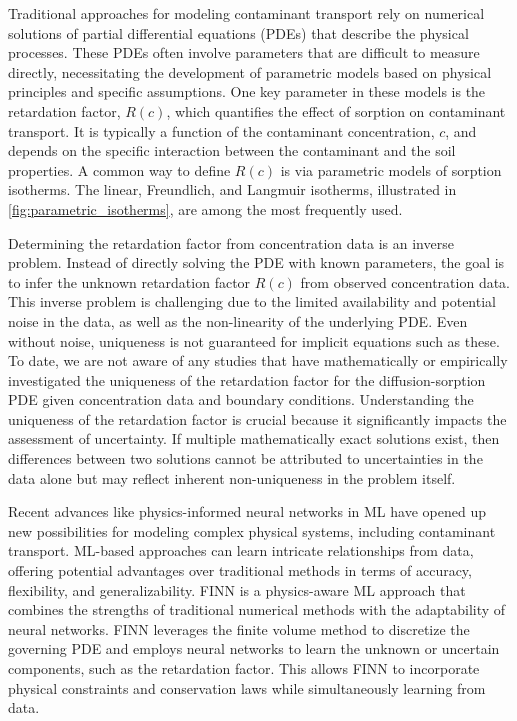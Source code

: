 Traditional approaches for modeling contaminant transport rely on numerical solutions of partial differential equations (PDEs) that describe the physical processes. These PDEs often involve parameters that are difficult to measure directly, necessitating the development of parametric models based on physical principles and specific assumptions.
One key parameter in these models is the retardation factor, $R(c)$, which quantifies the effect of sorption on contaminant transport. It is typically a function of the contaminant concentration, $c$, and depends on the specific interaction between the contaminant and the soil properties.
A common way to define $R(c)$ is via parametric models of sorption isotherms. The linear, Freundlich, and Langmuir isotherms, illustrated in \cref{fig:parametric_isotherms}, are among the most frequently used.

Determining the retardation factor from concentration data is an inverse problem. Instead of directly solving the PDE with known parameters, the goal is to infer the unknown retardation factor $R(c)$ from observed concentration data. This inverse problem is challenging due to the limited availability and potential noise in the data, as well as the non-linearity of the underlying PDE. Even without noise, uniqueness is not guaranteed for implicit equations such as these. To date, we are not aware of any studies that have mathematically or empirically investigated the uniqueness of the retardation factor for the diffusion-sorption PDE given concentration data and boundary conditions. Understanding the uniqueness of the retardation factor is crucial because it significantly impacts the assessment of uncertainty. If multiple mathematically exact solutions exist, then differences between two solutions cannot be attributed to uncertainties in the data alone but may reflect inherent non-uniqueness in the problem itself.

Recent advances like physics-informed neural networks in ML have opened up new possibilities for modeling complex physical systems, including contaminant transport. ML-based approaches can learn intricate relationships from data, offering potential advantages over traditional methods in terms of accuracy, flexibility, and generalizability. FINN \cite{finn} is a physics-aware ML approach that combines the strengths of traditional numerical methods with the adaptability of neural networks. FINN leverages the finite volume method to discretize the governing PDE and employs neural networks to learn the unknown or uncertain components, such as the retardation factor. This allows FINN to incorporate physical constraints and conservation laws while simultaneously learning from data.


